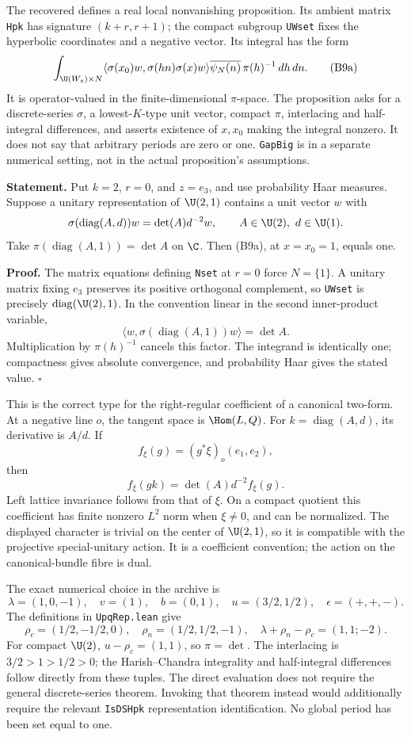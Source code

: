 \documentclass[11pt]{article}
\theoremstyle{definition}\newtheorem{definition}[theorem]{Definition}\newtheorem{remark}[theorem]{Remark}
\begin{document}
The recovered  defines a real local nonvanishing proposition. Its ambient matrix \texttt{Hpk} has signature $(k+r,r+1)$; the compact subgroup \texttt{UWset} fixes the hyperbolic coordinates and a negative vector. Its integral has the form
\[
 \int_{\U(W_z)\times N}
 \langle\sigma(x_0)w,\sigma(hn)\sigma(x)w\rangle
       \overline{\psi_N(n)}\,\pi(h)^{-1}\,dh\,dn.
 \tag{B9a}
\]
It is operator-valued in the finite-dimensional $\pi$-space. The proposition asks for a discrete-series $\sigma$, a lowest-$K$-type unit vector, compact $\pi$, interlacing and half-integral differences, and asserts existence of $x,x_0$ making the integral nonzero. It does not say that arbitrary periods are zero or one. \texttt{GapBig} is in a separate numerical setting, not in the actual proposition's assumptions.

\textbf{Statement.} Put $k=2$, $r=0$, and $z=e_3$, and use probability Haar measures. Suppose a unitary representation of $\U(2,1)$ contains a unit vector $w$ with
\[
 \sigma(\operatorname{diag}(A,d))w=\det(A)d^{-2}w,
 \qquad A\in\U(2),\ d\in\U(1).
\]
Take $\pi(\operatorname{diag}(A,1))=\det A$ on $\C$. Then (B9a), at $x=x_0=1$, equals one.

\textbf{Proof.} The matrix equations defining \texttt{Nset} at $r=0$ force $N=\{1\}$. A unitary matrix fixing $e_3$ preserves its positive orthogonal complement, so \texttt{UWset} is precisely $\operatorname{diag}(\U(2),1)$. In the convention linear in the second inner-product variable,
\[
 \langle w,\sigma(\operatorname{diag}(A,1))w\rangle=\det A.
\]
Multiplication by $\pi(h)^{-1}$ cancels this factor. The integrand is identically one; compactness gives absolute convergence, and probability Haar gives the stated value. \hfill$\square$

This is the correct type for the right-regular coefficient of a canonical two-form. At a negative line $o$, the tangent space is $\Hom(L,Q)$. For $k=\operatorname{diag}(A,d)$, its derivative is $A/d$. If
\[
 f_\xi(g)=(g^*\xi)_o(e_1,e_2),
\]
then
\[
 f_\xi(gk)=\det(A)d^{-2}f_\xi(g).
\]
Left lattice invariance follows from that of $\xi$. On a compact quotient this coefficient has finite nonzero $L^2$ norm when $\xi\ne0$, and can be normalized. The displayed character is trivial on the center of $\U(2,1)$, so it is compatible with the projective special-unitary action. It is a coefficient convention; the action on the canonical-bundle fibre is dual.

The exact numerical choice in the archive is
\[
 \lambda=(1,0,-1),\quad v=(1),\quad b=(0,1),\quad
 u=(3/2,1/2),\quad\epsilon=(+,+,-).
\]
The definitions in \texttt{UpqRep.lean} give
\[
 \rho_c=(1/2,-1/2,0),\quad\rho_n=(1/2,1/2,-1),\quad
 \lambda+\rho_n-\rho_c=(1,1;-2).
\]
For compact $\U(2)$, $u-\rho_c=(1,1)$, so $\pi=\det$. The interlacing is
$3/2>1>1/2>0$; the Harish--Chandra integrality and half-integral differences follow directly from these tuples. The direct evaluation does not require the general discrete-series theorem. Invoking that theorem instead would additionally require the relevant \texttt{IsDSHpk} representation identification. No global period has been set equal to one.
\end{document}
